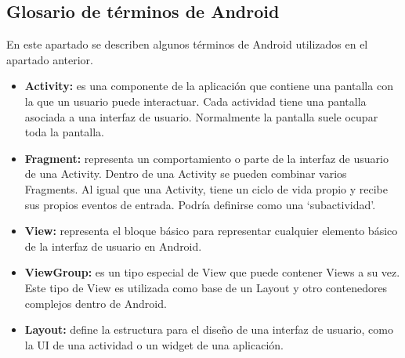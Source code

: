 \subsection{Glosario de términos de Android}
En este apartado se describen algunos términos de Android utilizados en el apartado anterior.
\begin{itemize}
	\item \textbf{Activity:} es una componente de la aplicación que contiene una pantalla con la que un usuario puede interactuar. Cada actividad tiene una pantalla asociada a una interfaz de usuario. Normalmente la pantalla suele ocupar toda la pantalla.
	\item \textbf{Fragment:} representa un comportamiento o parte de la interfaz de usuario de una Activity. Dentro de una Activity se pueden combinar varios Fragments. Al igual que una Activity, tiene un ciclo de vida propio y recibe sus propios eventos de entrada. Podría definirse como una \enquote*{subactividad}.
	\item \textbf{View:} representa el bloque básico para representar cualquier elemento básico de la interfaz de usuario en Android.
	\item \textbf{ViewGroup:} es un tipo especial de View que puede contener Views a su vez. Este tipo de View es utilizada como base de un Layout y otro contenedores complejos dentro de Android.
	\item \textbf{Layout:} define la estructura para el diseño de una interfaz de usuario, como la UI de una actividad o un widget de una aplicación.
\end{itemize}

